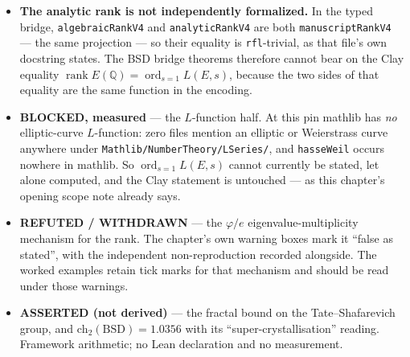\begin{itemize}
\item \textbf{The analytic rank is not independently formalized.} In the typed
bridge, \texttt{algebraicRankV4} and \texttt{analyticRankV4} are both
\texttt{manuscriptRankV4} --- the same projection --- so their equality is
\texttt{rfl}-trivial, as that file's own docstring states. The BSD bridge
theorems therefore cannot bear on the Clay equality
$\operatorname{rank} E(\mathbb{Q}) = \operatorname{ord}_{s=1} L(E,s)$, because
the two sides of that equality are the same function in the encoding.

\item \textbf{BLOCKED, measured} --- the $L$-function half. At this pin mathlib
has \emph{no} elliptic-curve $L$-function: zero files mention an elliptic or
Weierstrass curve anywhere under \texttt{Mathlib/NumberTheory/LSeries/}, and
\texttt{hasseWeil} occurs nowhere in mathlib. So
$\operatorname{ord}_{s=1} L(E,s)$ cannot currently be stated, let alone
computed, and the Clay statement is untouched --- as this chapter's opening
scope note already says.

\item \textbf{REFUTED / WITHDRAWN} --- the $\varphi/e$ eigenvalue-multiplicity
mechanism for the rank. The chapter's own warning boxes mark it ``false as
stated'', with the independent non-reproduction recorded alongside. The
worked examples retain tick marks for that mechanism and should be read under
those warnings.

\item \textbf{ASSERTED (not derived)} --- the fractal bound on
the Tate--Shafarevich group, and $\mathrm{ch}_2(\mathrm{BSD}) = 1.0356$ with its
``super-crystallisation'' reading. Framework arithmetic; no Lean declaration
and no measurement.


\end{itemize}
